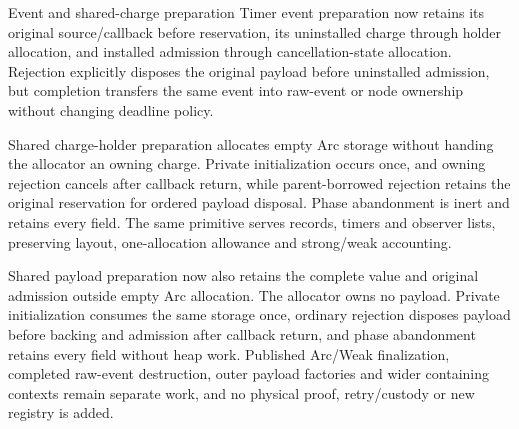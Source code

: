 \begin{implementationdetail}{Event and shared-charge preparation}
Timer event preparation now retains its original source/callback before
reservation, its uninstalled charge through holder allocation, and installed
admission through cancellation-state allocation. Rejection explicitly disposes
the original payload before uninstalled admission, but completion transfers the
same event into raw-event or node ownership without changing deadline policy.

Shared charge-holder preparation allocates empty Arc storage without handing
the allocator an owning charge. Private initialization occurs once, and owning
rejection cancels after callback return, while parent-borrowed rejection retains
the original reservation for ordered payload disposal. Phase abandonment is
inert and retains every field. The same primitive serves records, timers and
observer lists, preserving layout, one-allocation allowance and strong/weak
accounting.

Shared payload preparation now also retains the complete value and
original admission outside empty Arc allocation. The allocator owns no payload.
Private initialization consumes the same storage once, ordinary rejection
disposes payload before backing and admission after callback return, and phase
abandonment retains every field without heap work. Published Arc/Weak
finalization, completed raw-event destruction, outer payload factories and wider
containing contexts remain separate work, and no
physical proof, retry/custody or new registry is added.
\end{implementationdetail}

